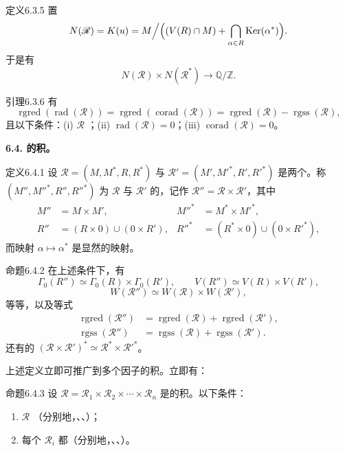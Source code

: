 \begin{SGAresult}{定义}{6.3.5}
置
\[N(\mathscr R)=K(u)=M\Big/\Bigl((V(R)\cap M)+\bigcap_{\alpha\in R}\operatorname{Ker}(\alpha^*)\Bigr).\]
于是有
\[N(\mathscr R)\times N(\mathscr R^*)\longrightarrow\mathbb Q/\mathbb Z.\]
\end{SGAresult}
\begin{SGAresult}{引理}{6.3.6}
有
\[\operatorname{rgred}(\operatorname{rad}(\mathscr R))=\operatorname{rgred}(\operatorname{corad}(\mathscr R))
=\operatorname{rgred}(\mathscr R)-\operatorname{rgss}(\mathscr R),\]
且以下条件：(i) $\mathscr R$ ；(ii) $\operatorname{rad}(\mathscr R)=0$；(iii) $\operatorname{corad}(\mathscr R)=0$。
\end{SGAresult}
\textbf{6.4. 的积。}
\begin{SGAresult}{定义}{6.4.1}
设 $\mathscr R=(M,M^*,R,R^*)$ 与 $\mathscr R'=(M',M'^*,R',R'^*)$ 是两个。称 $(M'',M''^*,R'',R''^*)$ 为 $\mathscr R$ 与 $\mathscr R'$ 的，记作 $\mathscr R''=\mathscr R\times\mathscr R'$，其中
\[\begin{aligned}
M''&=M\times M',&M''^*&=M^*\times M'^*,\\
R''&=(R\times0)\cup(0\times R'),&R''^*&=(R^*\times0)\cup(0\times R'^*),
\end{aligned}\]
而映射 $\alpha\mapsto\alpha^*$ 是显然的映射。
\end{SGAresult}
\begin{SGAresult}{命题}{6.4.2}
在上述条件下，有
\[\Gamma_0(R'')\simeq\Gamma_0(R)\times\Gamma_0(R'),\qquad V(R'')\simeq V(R)\times V(R'),\]
\[W(\mathscr R'')\simeq W(\mathscr R)\times W(\mathscr R'),\]
等等，以及等式
\[\begin{aligned}
\operatorname{rgred}(\mathscr R'')&=\operatorname{rgred}(\mathscr R)+\operatorname{rgred}(\mathscr R'),\\
\operatorname{rgss}(\mathscr R'')&=\operatorname{rgss}(\mathscr R)+\operatorname{rgss}(\mathscr R').
\end{aligned}\]
还有的 $(\mathscr R\times\mathscr R')^*\simeq\mathscr R^*\times\mathscr R'^*$。
\end{SGAresult}
上述定义立即可推广到多个因子的积。立即有：
\begin{SGAresult}{命题}{6.4.3}
设 $\mathscr R=\mathscr R_1\times\mathscr R_2\times\cdots\times\mathscr R_n$ 是的积。以下条件：
\begin{enumerate}
\item[(i)] $\mathscr R$ （分别地，、、）；
\item[(ii)] 每个 $\mathscr R_i$ 都（分别地，、、）。
\end{enumerate}
\end{SGAresult}
